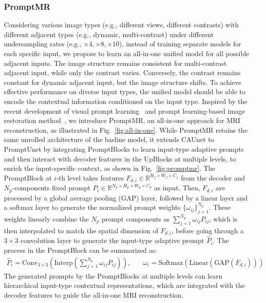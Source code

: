 \documentclass[runningheads]{llncs}
\begin{document}
\subsubsection{PromptMR}
Considering various image types (e.g., different views, different contrasts) with different adjacent types (e.g., dynamic, multi-contrast) under different undersampling rates (e.g., $\times 4, \times 8, \times 10$), instead of training separate models for each specific input, we propose to learn an all-in-one unified model for all possible adjacent inputs. 
The image structure remains consistent for multi-contrast adjacent input, while only the contrast varies. Conversely, the contrast remains constant for dynamic adjacent input, but the image structure shifts.
To achieve effective performance on diverse input types, the unified model should be able to encode the contextual information conditioned on the input type. Inspired by the recent development of visual prompt learning~\cite{jia2022visual,khattak2023maple} and prompt learning-based image restoration method~\cite{potlapalli2023promptir}, we introduce PromptMR, an all-in-one approach for MRI reconstruction, as illustrated in Fig.~\ref{fig:all-in-one}. While PromptMR retains the same unrolled architecture of the basline model, it extends CAUnet to PromptUnet by integrating PromptBlocks to learn input-type adaptive prompts and then interact with decoder features in the UpBlocks at multiple levels, to enrich the input-specific context,  as shown in Fig.~\ref{fig:promptmr}. 
The PromptBlock at $i$-th level takes features $F_{d,i}\in\mathbb{R}^{H_f\times W_f\times C_f}$ from the decoder and $N_p$-components fixed prompt $P_i\in\mathbb{R}^{N_p\times H_p\times W_p\times C_p}$ as input. Then, $F_{d,i}$ are processed by a global average pooling (GAP) layer, followed by a linear layer and a softmax layer to generate the normalized prompt weights $\{\omega_{ij}\}_{j=1}^{N_p}$. These weights linearly combine the $N_p$ prompt components as $\sum_{j=1}^{N_p} {\omega_{ij} P_{ij}}$, which is then interpolated to match the spatial dimension of $F_{d,i}$, before going through a $3\times3$ convolution layer to generate the input-type adaptive prompt $\hat{P}_i$. The process in the PromptBlock can be summarized as:
\begin{equation}
\label{eq:6}
\begin{array}{cc}
\hat{P}_{i}=\text{Conv}_{3\times 3}(\text{Interp}(\sum_{j=1}^{N_p} {\omega_{ij} P_{ij}})), &\quad  \omega_i = \text{Softmax}(\text{Linear}(\text{GAP}(F_{d,i})))
\end{array}
\end{equation}
The generated prompts by the PromptBlocks at multiple levels can learn hierarchical input-type contextual representations, which are integrated with the decoder features to guide the all-in-one MRI reconstruction.
\end{document}
